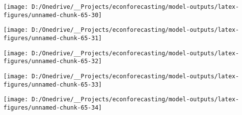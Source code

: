 \documentclass[11pt, letterpaper]{article}\usepackage[]{graphicx}\usepackage[]{color}
\begin{document}
{\centering \texttt{[image: D:/Onedrive/\_\_Projects/econforecasting/model-outputs/latex-figures/unnamed-chunk-65-30]} 

}




{\centering \texttt{[image: D:/Onedrive/\_\_Projects/econforecasting/model-outputs/latex-figures/unnamed-chunk-65-31]} 

}




{\centering \texttt{[image: D:/Onedrive/\_\_Projects/econforecasting/model-outputs/latex-figures/unnamed-chunk-65-32]} 

}




{\centering \texttt{[image: D:/Onedrive/\_\_Projects/econforecasting/model-outputs/latex-figures/unnamed-chunk-65-33]} 

}




{\centering \texttt{[image: D:/Onedrive/\_\_Projects/econforecasting/model-outputs/latex-figures/unnamed-chunk-65-34]} 

}
\end{document}

